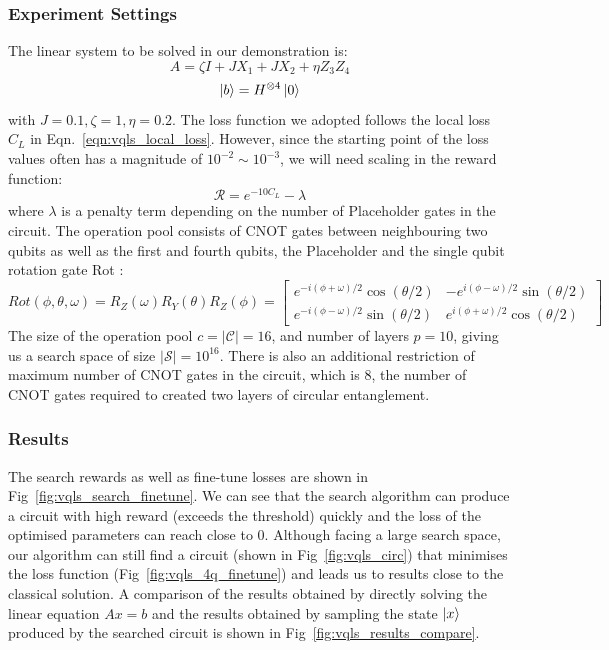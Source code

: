 \documentclass[a4paper,onecolumn,11pt]{quantumarticle}
\begin{document}
\subsubsection{Experiment Settings}
The linear system to be solved in our demonstration is:
\begin{equation}
    A = \zeta  I + J X_1 + J X_2  + \eta Z_3 Z_4
\end{equation}
\begin{equation}
    \ket{b} = H^{\otimes 4}\ket{0}
\end{equation}
with $J = 0.1, \zeta = 1, \eta = 0.2$.
The loss function we adopted follows the local loss $C_L$ in Eqn.~\ref{eqn:vqls_local_loss}. However, since the starting point of the loss values often has a magnitude of $10^{-2}\sim 10^{-3}$, we will need scaling in the reward function:
\begin{equation}
    \mathcal{R} = e^{-10 C_L}-\lambda
\end{equation}
where $\lambda$ is a penalty term depending on the number of Placeholder gates in the circuit. The operation pool consists of CNOT gates between neighbouring two qubits as well as the first and fourth qubits, the Placeholder and the single qubit rotation gate Rot \cite{nielsen00}:
\begin{equation}
Rot(\phi, \theta, \omega)=R_Z(\omega) R_Y(\theta) R_Z(\phi)=\left[\begin{array}{cc}
e^{-i(\phi+\omega) / 2} \cos (\theta / 2) & -e^{i(\phi-\omega) / 2} \sin (\theta / 2) \\
e^{-i(\phi-\omega) / 2} \sin (\theta / 2) & e^{i(\phi+\omega) / 2} \cos (\theta / 2)
\end{array}\right]
\end{equation}
The size of the operation pool $c = \vert \mathcal{C}\vert = 16$, and number of layers $p = 10$, giving us a search space of size $\vert \mathcal{S} \vert = 10^{16}$. There is also an additional restriction of maximum number of CNOT gates in the circuit, which is 8, the number of CNOT gates required to created two layers of circular entanglement.


\subsubsection{Results}
The search rewards as well as fine-tune losses are shown in Fig~\ref{fig:vqls_search_finetune}. We can see that the search algorithm can produce a circuit with high reward (exceeds the threshold) quickly and the loss of the optimised parameters can reach close to 0. Although facing a large search space, our algorithm can still find a circuit (shown in Fig~\ref{fig:vqls_circ}) that minimises the loss function (Fig~\ref{fig:vqls_4q_finetune}) and leads us to results close to the classical solution. A comparison of the results obtained by directly solving the linear equation $Ax=b$ and the results obtained by sampling the state $\ket{x}$ produced by the searched circuit is shown in Fig~\ref{fig:vqls_results_compare}. 
\end{document}
